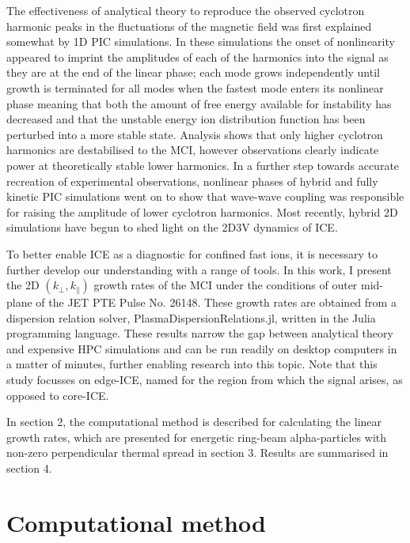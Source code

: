\documentclass[12pt]{iopart}
\begin{document}
The effectiveness of analytical theory to reproduce the observed cyclotron
harmonic peaks in the fluctuations of the magnetic field was first explained
somewhat by 1D PIC simulations. In these simulations the onset of nonlinearity
appeared to imprint the amplitudes of each of the harmonics into the signal as
they are at the end of the linear phase; each mode grows independently until 
growth is terminated for all modes when the fastest mode enters its nonlinear
phase meaning that both the amount of free energy available for instability has
decreased and that the unstable energy ion distribution function has been
perturbed into a more stable state. Analysis shows that only higher cyclotron
harmonics are destabilised\cite{McClements2015} to the MCI, however observations
clearly indicate power at theoretically stable lower
harmonics\cite{Cottrell1988}. In a further step towards accurate recreation of
experimental observations, nonlinear phases of hybrid\cite{Carbajal2014} and
fully kinetic\cite{Cook2013,Chapman2017} PIC simulations went on to show that
wave-wave coupling was responsible for raising the amplitude of lower cyclotron
harmonics. Most recently, hybrid 2D simulations have begun to shed light on the
2D3V dynamics of ICE\cite{Carbajal2021}.

To better enable ICE as a diagnostic for confined fast ions, it is necessary to
further develop our understanding with a range of tools. In this work, I present
the 2D $(k_\perp, k_\parallel)$ growth rates of the MCI under the conditions of
outer mid-plane of the JET PTE\cite{Cottrell1993} Pulse No. 26148. These growth
rates are obtained from a dispersion relation solver,
PlasmaDispersionRelations.jl, written in the Julia programming
language\cite{Bezanson2017}. These results narrow the gap between analytical
theory and expensive HPC simulations and can be run readily on desktop computers
in a matter of minutes, further enabling research into this topic. Note that
this study focusses on edge-ICE, named for the region from which the signal
arises, as opposed to core-ICE\cite{Ochoukov2018}.

In section 2, the computational method is described for calculating the linear growth rates, which are presented for energetic ring-beam alpha-particles with non-zero perpendicular thermal spread in section 3. Results are summarised in section 4.

\section{Computational method}
\end{document}
